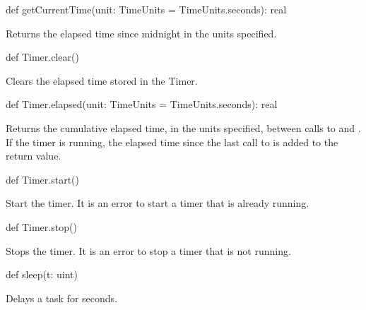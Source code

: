 \begin{protohead}
def getCurrentTime(unit: TimeUnits = TimeUnits.seconds): real
\end{protohead}
\begin{protobody}
Returns the elapsed time since midnight in the units specified.
\end{protobody}

\begin{protohead}
def Timer.clear()
\end{protohead}
\begin{protobody}
Clears the elapsed time stored in the Timer.
\end{protobody}

\begin{protohead}
def Timer.elapsed(unit: TimeUnits = TimeUnits.seconds): real
\end{protohead}
\begin{protobody}
Returns the cumulative elapsed time, in the units specified, between
calls to  and .  If the timer is running, the
elapsed time since the last call to  is added to the
return value.
\end{protobody}

\begin{protohead}
def Timer.start()
\end{protohead}
\begin{protobody}
Start the timer.  It is an error to start a timer that is already
running.
\end{protobody}

\begin{protohead}
def Timer.stop()
\end{protohead}
\begin{protobody}
Stops the timer.  It is an error to stop a timer that is not running.
\end{protobody}

\begin{protohead}
def sleep(t: uint)
\end{protohead}
\begin{protobody}
Delays a task for  seconds.
\end{protobody}

